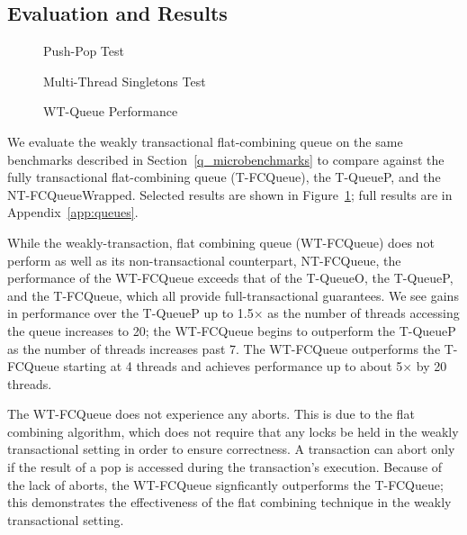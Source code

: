 \subsection{Evaluation and Results}

\begin{figure}[t]
    \centering
	\begin{minipage}{0.75\textwidth}
        \caption*{Push-Pop Test}
        \vspace{12pt}
	\end{minipage}
	\begin{minipage}{0.75\textwidth}
        \caption*{Multi-Thread Singletons Test}
	\end{minipage}
    \caption{WT-Queue Performance}
    \label{fig:wtqs}
\end{figure}


We evaluate the weakly transactional flat-combining queue on the same benchmarks described in Section~\ref{q_microbenchmarks} to compare against the fully transactional flat-combining queue (T-FCQueue), the T-QueueP, and the NT-FCQueueWrapped. Selected results are shown in Figure~\ref{fig:wtqs}; full results are in Appendix~\ref{app:queues}. 

While the weakly-transaction, flat combining queue (WT-FCQueue) does not perform as well as its non-transactional counterpart, NT-FCQueue, the performance of the WT-FCQueue exceeds that of the T-QueueO, the T-QueueP, and the T-FCQueue, which all provide full-transactional guarantees. We see gains in performance over the T-QueueP up to 1.5$\times$ as the number of threads accessing the queue increases to 20; the WT-FCQueue begins to outperform the T-QueueP as the number of threads increases past 7. The WT-FCQueue outperforms the T-FCQueue starting at 4 threads and achieves performance up to about 5$\times$ by 20 threads.
 
The WT-FCQueue does not experience any aborts. This is due to the flat combining algorithm, which does not require that any locks be held in the weakly transactional setting in order to ensure correctness. A transaction can abort only if the result of a pop is accessed during the transaction's execution.
Because of the lack of aborts, the WT-FCQueue signficantly outperforms the T-FCQueue; this demonstrates the effectiveness of the flat combining technique in the weakly transactional setting. 

